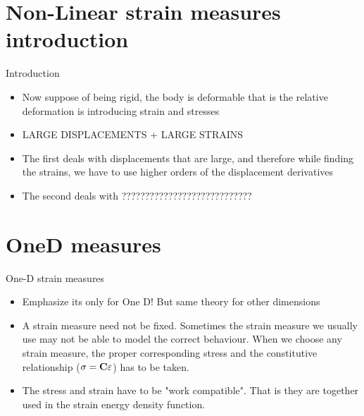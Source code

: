 \section{Non-Linear strain measures introduction}

	\begin{frame}{Introduction}
		\begin{itemize}
			\item Now suppose of being rigid, the body is deformable that is the relative deformation is introducing strain and stresses
			\item LARGE DISPLACEMENTS + LARGE STRAINS
			\item The first deals with displacements that are large, and therefore while finding the strains, we have to use higher orders of the displacement derivatives
			\item The second deals with ????????????????????????????		
		\end{itemize}
	\end{frame}

\section{OneD measures}
	\begin{frame}{One-D strain measures}
		\begin{itemize}
			\item Emphasize its only for One D! But same theory for other dimensions
			\item A strain measure need not be fixed. Sometimes the strain measure we usually use may not be able to model the correct behaviour. When we choose any strain measure, the proper corresponding stress and the  constitutive relationship ($\mathbf{\sigma = C \varepsilon}$) has to be taken. 
			\item The stress and strain have to be "work compatible". That is they are together used in the strain energy density function. 			
		\end{itemize}
	\end{frame}

